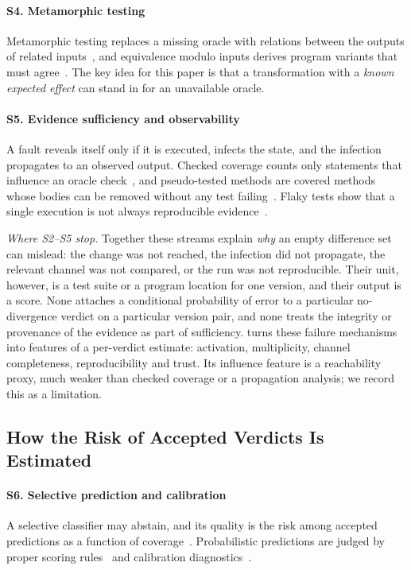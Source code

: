 \paragraph*{S4. Metamorphic testing} Metamorphic testing replaces a missing oracle with relations between the outputs of related inputs~\cite{chen2018metamorphic,segura2016survey}, and equivalence modulo inputs derives program variants that must agree~\cite{le2014compiler}. The key idea for this paper is that a transformation with a \emph{known expected effect} can stand in for an unavailable oracle.

\paragraph*{S5. Evidence sufficiency and observability} A fault reveals itself only if it is executed, infects the state, and the infection propagates to an observed output. Checked coverage counts only statements that influence an oracle check~\cite{schuler2011assessing,schuler2013checked}, and pseudo-tested methods are covered methods whose bodies can be removed without any test failing~\cite{niedermayr2016will,veraperez2018descartes,veraperez2019comprehensive}. Flaky tests show that a single execution is not always reproducible evidence~\cite{luo2014empirical,parry2022survey}.

\emph{Where S2--S5 stop.} Together these streams explain \emph{why} an empty difference set can mislead: the change was not reached, the infection did not propagate, the relevant channel was not compared, or the run was not reproducible. Their unit, however, is a test suite or a program location for one version, and their output is a score. None attaches a conditional probability of error to a particular no-divergence verdict on a particular version pair, and none treats the integrity or provenance of the evidence as part of sufficiency. \sbg{} turns these failure mechanisms into features of a per-verdict estimate: activation, multiplicity, channel completeness, reproducibility and trust. Its influence feature is a reachability proxy, much weaker than checked coverage or a propagation analysis; we record this as a limitation.

\subsection{How the Risk of Accepted Verdicts Is Estimated}
\paragraph*{S6. Selective prediction and calibration} A selective classifier may abstain, and its quality is the risk among accepted predictions as a function of coverage~\cite{chow1970optimum,elyaniv2010foundations,geifman2017selective,hendrickx2024machine}. Probabilistic predictions are judged by proper scoring rules~\cite{brier1950verification} and calibration diagnostics~\cite{niculescumizil2005predicting,guo2017calibration}.

